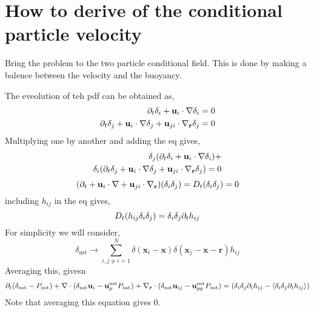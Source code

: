 \section{How to derive of the conditional particle velocity}

Bring the problem to the two particle conditional field. 
This is done by making a balence between the velocity and the buoyancy. 


The eveolution of teh pdf can be obtained as, 
\begin{align*}
    \partial_t \delta_i + \textbf{u}_i \cdot \mathbf{\nabla} \delta_i = 0\\
    \partial_t \delta_j + \textbf{u}_i \cdot \mathbf{\nabla} \delta_j  + \textbf{u}_{ji}\cdot {\mathbf{\nabla}_\textbf{r}} \delta_j = 0\\
\end{align*}
Multiplying one by another and adding the eq gives,  
\begin{align*}
    \delta_j(\partial_t \delta_i + \textbf{u}_i \cdot \mathbf{\nabla} \delta_i) + \\
    \delta_i (\partial_t \delta_j + \textbf{u}_i \cdot \mathbf{\nabla} \delta_j  + \textbf{u}_{ji}\cdot {\mathbf{\nabla}_\textbf{r}} \delta_j) = 0\\
\end{align*}
\begin{equation}
    (\partial_t 
    + \textbf{u}_i \cdot \mathbf{\nabla} 
    + \textbf{u}_{ji} \cdot {\mathbf{\nabla}_\textbf{r}}) (\delta_i \delta_j) = D_t(\delta_i \delta_j) = 0
\end{equation}
including $h_{ij}$ in the eq gives, 
\begin{equation}
    D_t(h_{ij} \delta_i \delta_j )
    = \delta_i \delta_j \partial_t h_{ij}
\end{equation}
For simplicity we will consider, 
\begin{equation}
    \delta_\text{nst}\to 
    \sum_{i,j\neq i = 1}^N \delta(\textbf{x}_i-\textbf{x})\delta(\textbf{x}_j-\textbf{x} - \textbf{r}) h_{ij}
\end{equation}
Averaging this, 
givesn 
\begin{equation}
    \partial_t (\delta_\text{nst} - P_\text{nst}) 
    + \mathbf{\nabla}\cdot (\delta_\text{nst} \textbf{u}_i - \textbf{u}_p^\text{nst}P_\text{nst})
    + {\mathbf{\nabla}_\textbf{r}} \cdot(\delta_\text{nst} \textbf{u}_{ij} -  \textbf{u}_{pq}^\text{nst}P_\text{nst})
    = (\delta_i \delta_j \partial_t h_{ij} -  \left<\delta_i \delta_j \partial_t h_{ij}\right>)
\end{equation}
Note that averaging this equation gives $0$. 

